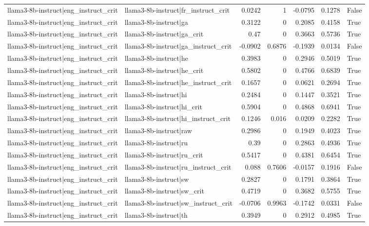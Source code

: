 \begin{table}
\begin{tabular}{l l r r r r l}
llama3-8b-instruct|eng_instruct_crit & llama3-8b-instruct|fr_instruct_crit & 0.0242 & 1 & -0.0795 & 0.1278 & False \\
llama3-8b-instruct|eng_instruct_crit & llama3-8b-instruct|ga & 0.3122 & 0 & 0.2085 & 0.4158 & True \\
llama3-8b-instruct|eng_instruct_crit & llama3-8b-instruct|ga_crit & 0.47 & 0 & 0.3663 & 0.5736 & True \\
llama3-8b-instruct|eng_instruct_crit & llama3-8b-instruct|ga_instruct_crit & -0.0902 & 0.6876 & -0.1939 & 0.0134 & False \\
llama3-8b-instruct|eng_instruct_crit & llama3-8b-instruct|he & 0.3983 & 0 & 0.2946 & 0.5019 & True \\
llama3-8b-instruct|eng_instruct_crit & llama3-8b-instruct|he_crit & 0.5802 & 0 & 0.4766 & 0.6839 & True \\
llama3-8b-instruct|eng_instruct_crit & llama3-8b-instruct|he_instruct_crit & 0.1657 & 0 & 0.0621 & 0.2694 & True \\
llama3-8b-instruct|eng_instruct_crit & llama3-8b-instruct|hi & 0.2484 & 0 & 0.1447 & 0.3521 & True \\
llama3-8b-instruct|eng_instruct_crit & llama3-8b-instruct|hi_crit & 0.5904 & 0 & 0.4868 & 0.6941 & True \\
llama3-8b-instruct|eng_instruct_crit & llama3-8b-instruct|hi_instruct_crit & 0.1246 & 0.016 & 0.0209 & 0.2282 & True \\
llama3-8b-instruct|eng_instruct_crit & llama3-8b-instruct|raw & 0.2986 & 0 & 0.1949 & 0.4023 & True \\
llama3-8b-instruct|eng_instruct_crit & llama3-8b-instruct|ru & 0.39 & 0 & 0.2863 & 0.4936 & True \\
llama3-8b-instruct|eng_instruct_crit & llama3-8b-instruct|ru_crit & 0.5417 & 0 & 0.4381 & 0.6454 & True \\
llama3-8b-instruct|eng_instruct_crit & llama3-8b-instruct|ru_instruct_crit & 0.088 & 0.7606 & -0.0157 & 0.1916 & False \\
llama3-8b-instruct|eng_instruct_crit & llama3-8b-instruct|sw & 0.2827 & 0 & 0.1791 & 0.3864 & True \\
llama3-8b-instruct|eng_instruct_crit & llama3-8b-instruct|sw_crit & 0.4719 & 0 & 0.3682 & 0.5755 & True \\
llama3-8b-instruct|eng_instruct_crit & llama3-8b-instruct|sw_instruct_crit & -0.0706 & 0.9963 & -0.1742 & 0.0331 & False \\
llama3-8b-instruct|eng_instruct_crit & llama3-8b-instruct|th & 0.3949 & 0 & 0.2912 & 0.4985 & True \\

\end{tabular}
\end{table}
